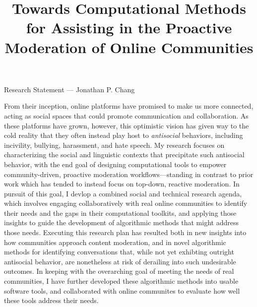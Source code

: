 \documentclass[11pt,letterpaper]{article}
\title{Towards Computational Methods for Assisting in the Proactive Moderation of Online Communities}
\begin{document}
\maketitle

\begin{center}
Research Statement --- Jonathan P. Chang
\end{center}

From their inception, online platforms have promised to make us more connected, acting as social spaces that could promote communication and collaboration. 
As these platforms have grown, however, this optimistic vision has given way to the cold reality that they often instead play host to \emph{antisocial} behaviors, including incivility, bullying, harassment, and hate speech. 
%
My research focuses on characterizing the social and linguistic contexts that precipitate such antisocial behavior, with the end goal of designing computational tools to empower community-driven, proactive moderation workflows---standing in contrast to prior work which has tended to instead focus on top-down, reactive moderation.
In pursuit of this goal, I devlop a combined social and technical research agenda, which involves engaging collaboratively with real online communities to identify their needs and the gaps in their computational toolkits, and applying those insights to guide the development of algorithmic methods that might address those needs.
Executing this research plan has resulted both in new insights into how communities approach content moderation, and in novel algorithmic methods for identifying conversations that, while not yet exhibting outright antisocial behavior, are nonetheless at risk of derailing into such undesirable outcomes.
In keeping with the overarching goal of meeting the needs of real communities, I have further developed these algorithmic methods into usable software tools, and collaborated with online communites to evaluate how well these tools address their needs.
\end{document}

